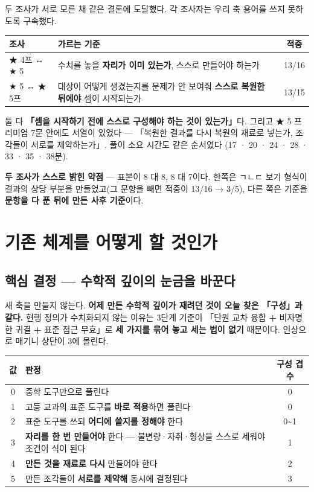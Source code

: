 \documentclass[11pt]{article}
\begin{document}
두 조사가 서로 모른 채 같은 결론에 도달했다. 각 조사자는 우리 축 용어를 쓰지 못하도록 구속했다.

\begin{center}
\begin{tabular}{@{}p{28mm}p{85mm}c@{}}
\toprule
\textbf{조사} & \textbf{가르는 기준} & \textbf{적중} \\
\midrule
★ 4프 ↔ ★ 5 & 수치를 놓을 \textbf{자리가 이미 있는가}, 스스로 만들어야 하는가 & 13/16 \\
★ 5 ↔ ★ 5프 & 대상이 어떻게 생겼는지를 문제가 안 보여줘 \textbf{스스로 복원한 뒤에야} 셈이 시작되는가 & 13/15 \\
\bottomrule
\end{tabular}
\end{center}

\vspace{2mm}
둘 다 \textbf{「셈을 시작하기 전에 스스로 구성해야 하는 것이 있는가」}다.
그리고 ★ 5 프리미엄 7문 안에도 서열이 있었다 —
「복원한 결과를 다시 복원의 재료로 넣는가, 조각들이 서로를 제약하는가」.
풀이 소요 시간도 같은 순서였다 (17 · 20 · 24 · 28 · 33 · 35 · 38분).

\textbf{두 조사가 스스로 밝힌 약점} — 표본이 8 대 8, 8 대 7이다. 한쪽은 ㄱㄴㄷ 보기 형식이
결과의 상당 부분을 만들었고(그 문항을 빼면 적중이 13/16 → 3/5), 다른 쪽은 기준을
\textbf{문항을 다 푼 뒤에 만든 사후 기준}이다.

\section{기존 체계를 어떻게 할 것인가}

\subsection{핵심 결정 — 수학적 깊이의 눈금을 바꾼다}

새 축을 만들지 않는다. \textbf{어제 만든 수학적 깊이가 재려던 것이 오늘 찾은 「구성」과 같다.}
현행 정의가 수치화되지 않는 이유는 3단계 기준이
「단원 교차 융합 \textbf{+} 비자명한 귀결 \textbf{+} 표준 접근 무효」로 \textbf{세 가지를 묶어 놓고
세는 법이 없기} 때문이다. 인상으로 매기니 상단이 3에 몰린다.

\begin{center}
\begin{tabular}{@{}cp{88mm}c@{}}
\toprule
\textbf{값} & \textbf{판정} & \textbf{구성 겹수} \\
\midrule
0 & 중학 도구만으로 풀린다 & 0 \\
1 & 고등 교과의 표준 도구를 \textbf{바로 적용}하면 풀린다 & 0 \\
2 & 표준 도구를 쓰되 \textbf{어디에 쓸지를 정해야} 한다 & 0\textasciitilde1 \\
3 & \textbf{자리를 한 번 만들어야} 한다 — 불변량·자취·형상을 스스로 세워야 조건이 식이 된다 & 1 \\
4 & \textbf{만든 것을 재료로 다시} 만들어야 한다 & 2 \\
5 & 만든 조각들이 \textbf{서로를 제약해} 동시에 결정된다 & 3 \\
\bottomrule
\end{tabular}
\end{center}
\end{document}
